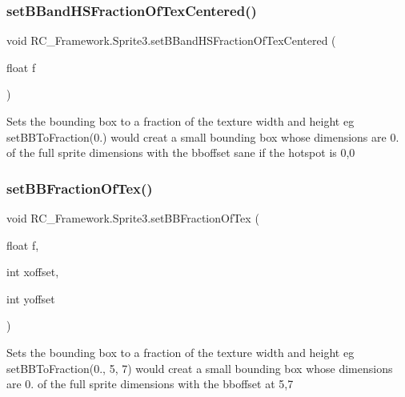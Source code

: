 \subsubsection{\texorpdfstring{set\+B\+Band\+H\+S\+Fraction\+Of\+Tex\+Centered()}{setBBandHSFractionOfTexCentered()}}
{\footnotesize\ttfamily void R\+C\+\_\+\+Framework.\+Sprite3.\+set\+B\+Band\+H\+S\+Fraction\+Of\+Tex\+Centered (\begin{DoxyParamCaption}\item[{float}]{f }\end{DoxyParamCaption})}



Sets the bounding box to a fraction of the texture width and height eg set\+B\+B\+To\+Fraction(0.) would creat a small bounding box whose dimensions are 0. of the full sprite dimensions with the bboffset sane if the hotspot is 0,0 

\mbox{\label{class_r_c___framework_1_1_sprite3_a899837f4fa3d7c5736a31b30de845707}} 
\subsubsection{\texorpdfstring{set\+B\+B\+Fraction\+Of\+Tex()}{setBBFractionOfTex()}}
{\footnotesize\ttfamily void R\+C\+\_\+\+Framework.\+Sprite3.\+set\+B\+B\+Fraction\+Of\+Tex (\begin{DoxyParamCaption}\item[{float}]{f,  }\item[{int}]{xoffset,  }\item[{int}]{yoffset }\end{DoxyParamCaption})}



Sets the bounding box to a fraction of the texture width and height eg set\+B\+B\+To\+Fraction(0., 5, 7) would creat a small bounding box whose dimensions are 0. of the full sprite dimensions with the bboffset at 5,7 

\mbox{\label{class_r_c___framework_1_1_sprite3_ad599fbce8c9402618ead1232fc9d0539}} 
